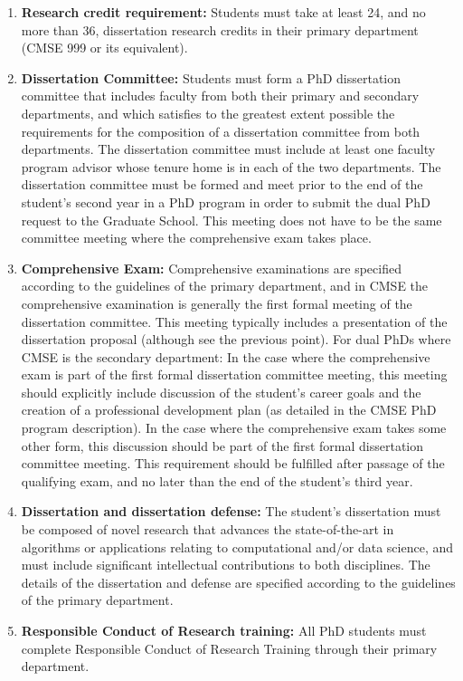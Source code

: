 \begin{enumerate}
\item \textbf{Research credit requirement:}  Students must take at
  least 24, and no more than 36, dissertation research credits in
  their primary department (CMSE 999 or its equivalent).

\item \textbf{Dissertation Committee:} Students must form a PhD dissertation
  committee that includes faculty from both their primary and
  secondary departments, and which satisfies to the greatest extent
  possible the requirements for the composition of a dissertation committee
  from both departments.  The dissertation committee must include at least
  one faculty program advisor whose tenure home is in each of the two
  departments.  The dissertation committee must be formed and meet prior to
  the end of the student's second year in a PhD program in order to
  submit the dual PhD request to the Graduate School.  This meeting
  does not have to be the same committee meeting where the
  comprehensive exam takes place.

\item \textbf{Comprehensive Exam:}  Comprehensive examinations are
  specified according to the guidelines of the primary department, and
  in CMSE the comprehensive examination is generally the first formal
  meeting of the dissertation committee.  This meeting typically
  includes a 
  presentation of the dissertation proposal (although see the previous
  point).  For dual PhDs where CMSE is the secondary department: In
  the case where the comprehensive exam is part of the first formal
  dissertation committee meeting, this meeting should explicitly include
  discussion of the student's career goals and the creation of a
  professional development plan (as detailed in the CMSE PhD program
  description).  In the case where the comprehensive exam takes some
  other form, this discussion should be part of the first formal
  dissertation committee meeting.  This requirement should be fulfilled
  after passage of the qualifying exam, and no later than the end of
 the student's third year.

\item \textbf{Dissertation and dissertation defense:} The student's
  dissertation must be composed of novel research that advances the
  state-of-the-art in algorithms or applications relating to
  computational and/or data science, and must include significant
  intellectual contributions to both disciplines.  The details of the
  dissertation and defense are specified according to the guidelines
  of the primary department.

\item \textbf{Responsible Conduct of Research training:} All PhD
  students must complete Responsible Conduct of Research Training
  through their primary department.

\end{enumerate}

